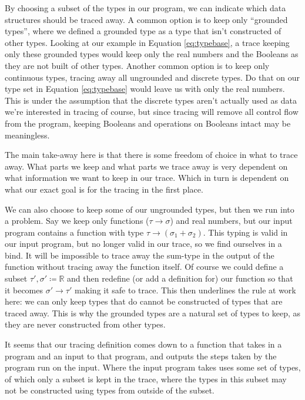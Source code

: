     By choosing a subset of the types in our program, we can indicate which data structures should be traced away.
    A common option is to keep only ``grounded types'', where we defined a grounded type as a type that isn't constructed of other types.
    Looking at our example in Equation \ref{eq:typebase}, a trace keeping only these grounded types would keep only the real numbers and the Booleans as they are not built of other types.
    Another common option is to keep only continuous types, tracing away all ungrounded and discrete types.
    Do that on our type set in Equation \ref{eq:typebase} would leave us with only the real numbers.
    This is under the assumption that the discrete types aren't actually used as data we're interested in tracing of course, but since tracing will remove all control flow from the program, keeping Booleans and operations on Booleans intact may be meaningless. 

    The main take-away here is that there is some freedom of choice in what to trace away.
    What parts we keep and what parts we trace away is very dependent on what information we want to keep in our trace.
    Which in turn is dependent on what our exact goal is for the tracing in the first place.
    
    We can also choose to keep some of our ungrounded types, but then we run into a problem.
    Say we keep only functions ($\tau\to\sigma$) and real numbers, but our input program contains a function with type $\tau\to(\sigma_1+\sigma_2)$.
    This typing is valid in our input program, but no longer valid in our trace, so we find ourselves in a bind.
    It will be impossible to trace away the sum-type in the output of the function without tracing away the function itself.
    Of course we could define a subset $\tau',\sigma'\coloneqq\mathbb{R}$ and then redefine (or add a definition for) our function so that it becomes $\sigma'\to\tau'$ making it safe to trace.
    This then underlines the rule at work here: we can only keep types that do cannot be constructed of types that are traced away.
    This is why the grounded types are a natural set of types to keep, as they are never constructed from other types.

    It seems that our tracing definition comes down to a function that takes in a program and an input to that program, and outputs the steps taken by the program run on the input.
    Where the input program takes uses some set of types, of which only a subset is kept in the trace, where the types in this subset may not be constructed using types from outside of the subset.

